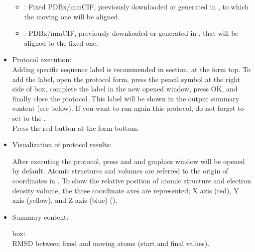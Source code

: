 \begin{itemize}
   \begin{itemize}
    \item {}: Fixed PDBx/mmCIF, previously downloaded or generated in \scipion, to which the moving one will be aligned. 
    \item {}: PDBx/mmCIF, previously downloaded or generated in \scipion, that will be aligned to the fixed one.
   \end{itemize}
 
 \item Protocol execution:\\
 Adding specific sequence label is recommended in  section, at the form top. To add the label, open the protocol form, press the pencil symbol at the right side of  box, complete the label in the new opened window, press OK, and finally close the protocol. This label will be shown in the output summary content (see below). If you want to run again this protocol, do not forget to set to  the .\\
  Press the  red button at the form bottom.
  
 \item Visualization of protocol results:
 
 After executing the protocol, press  and and \chimera graphics window will be opened by default. Atomic structures and volumes are referred to the origin of coordinates in \chimera. To show the relative position of atomic structure and electron density volume, the three coordinate axes are represented; X axis (red), Y axis (yellow), and Z axis (blue) ().
    
 \item Summary content:
 
   box:\\RMSD between fixed and moving atoms (start and final values).
\end{itemize}

